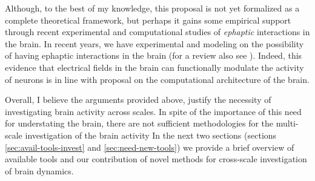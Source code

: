 Although, to the best of my knowledge, this proposal is not yet formalized as a complete theoretical framework,
but perhaps it gains some empirical support through recent experimental and computational studies of \emph{ephaptic} interactions in the brain.
In recent years, we have experimental \cite{anastassiouEphapticCouplingCortical2011}
and modeling \cite{anastassiouEphapticCouplingCortical2011,ruffiniRealisticModelingMesoscopic2020,sheheitliMathematicalModelEphaptic2020}
on the possibility of having ephaptic interactions in the brain
(for a review also see \cite{anastassiouEphapticCouplingEndogenous2014}).
Indeed, this evidence that electrical fields in the brain can functionally modulate the activity of neurons is in line with \citet{bellLevelsLoopsFuture1999,bellCrossLevelTheory2007} proposal on the computational architecture of the brain.


Overall, I believe the arguments provided above,
justify the necessity of investigating brain activity across scales.
In spite of the importance of this need for understating the brain,
there are not sufficient methodologies for the multi-scale investigation of the brain activity
In the next two sections (sections \ref{sec:avail-tools-invest} and \ref{sec:need-new-tools}) 
we provide a brief overview of available tools and our contribution of novel methods for cross-scale investigation of brain dynamics.
